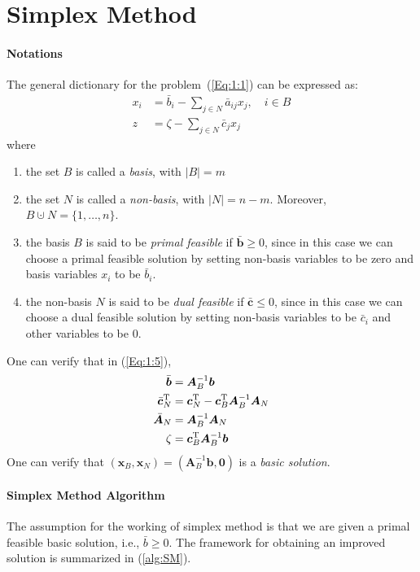 \section{Simplex Method}

\paragraph{Notations}
The general dictionary for the problem~(\ref{Eq:1:1}) can be expressed as:
\begin{equation}\label{Eq:1:5}
\begin{aligned}
x_i&=\bar b_i -\sum_{j\in N}\bar{a}_{ij}x_j,\quad i\in B\\
z&=\zeta - \sum_{j\in N}\bar c_jx_j
\end{aligned}
\end{equation}
where
\begin{enumerate}
\item
the set $B$ is called a \emph{basis}, with $|B|=m$
\item
the set $N$ is called a \emph{non-basis}, with $|N|=n-m$. Moreover, $B\cupdot N = \{1,\dots,n\}$.
\item
the basis $B$ is said to be \emph{primal feasible} if $\bar{\bm b}\ge0$, since in this case we can choose a primal feasible solution by setting non-basis variables to be zero and basis variables $x_i$ to be $\bar{b}_i$.
\item
the non-basis $N$ is said to be \emph{dual feasible} if $\bar{\bm c}\le 0$, since in this case we can choose a dual feasible solution by setting non-basis variables to be $\bar{c}_i$ and other variables to be $0$.
\end{enumerate}
One can verify that in (\ref{Eq:1:5}), 
\begin{align*}
\bar{\bm b}&=\bm A_B^{-1}\bm b\\
\bar{\bm c}_N^{\mathrm T}&=\bm c_N^{\mathrm T} - \bm c_B^{\mathrm T}\bm A_B^{-1}\bm A_N\\
\bar{\bm A}_N&=\bm A_B^{-1}\bm A_N\\
\zeta&=\bm c_B^{\mathrm T}\bm A_B^{-1}\bm b
\end{align*}
One can verify that $(\bm x_B,\bm x_N)=(\bm A_B^{-1}\bm b,\bm0)$ is a \emph{basic solution}.

\paragraph{Simplex Method Algorithm}
The assumption for the working of simplex method is that we are given a primal feasible basic solution, i.e., $\bar{b}\ge0$. The framework for obtaining an improved solution is summarized in (\ref{alg:SM}).


